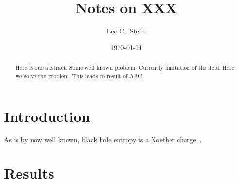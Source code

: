 \documentclass[aps,prd,twocolumn,superscriptaddress,preprintnumbers,floatfix,nofootinbib]{revtex4-2}
\begin{document}
\title{Notes on XXX}

\author{Leo C.\ Stein\,}


\date{\today}

\begin{abstract}
  Here is our abstract.
  Some well known problem.
  Currently limitation of the field.
  Here we solve the problem.
  This leads to result of ABC.
\end{abstract}

\maketitle


\section{Introduction}
\label{sec:introduction}

As is by now well known, black hole entropy is a Noether
charge~\cite{Wald:1993nt, Noether:1918zz}.
\lipsum[1]

\section{Results}
\label{sec:results}
\end{document}
